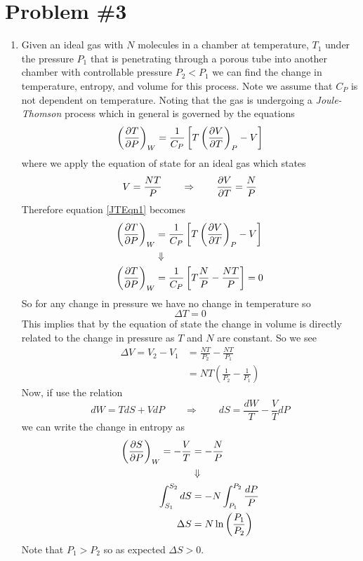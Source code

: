 \documentclass[11pt]{article}
\numberwithin{equation}{section}
\begin{document}
\section{Problem \#3}
\begin{enumerate}[(1)]
\item Given an ideal gas with $N$ molecules in a chamber at temperature, $T_1$ under the 
pressure $P_1$ that is penetrating through a porous tube into another chamber with 
controllable pressure $P_2<P_1$ we can find the change in temperature, entropy, and volume 
for this process. Note we assume that $C_P$ is not dependent on temperature. Noting that
the gas is undergoing a \emph{Joule-Thomson} process which in general is governed by the 
equations
\begin{equation}
\left(\frac{\partial{T}}{\partial{P}}\right)_{W} = \frac{1}{C_P}\left[T\left(\frac{\partial{V}}{\partial{T}}\right)_{P}-V\right]
\label{JTEqn1}
\end{equation}
where we apply the equation of state for an ideal gas which states
$$V = \frac{NT}{P}\qquad\Rightarrow\qquad \frac{\partial{V}}{\partial{T}} = \frac{N}{P}$$
Therefore equation \ref{JTEqn1} becomes
\begin{align*}
\left(\frac{\partial{T}}{\partial{P}}\right)_{W} &= \frac{1}{C_P}\left[T\left(\frac{\partial{V}}{\partial{T}}\right)_{P}-V\right]\\
&\Downarrow\\
\left(\frac{\partial{T}}{\partial{P}}\right)_{W} &= \frac{1}{C_P}\left[T\frac{N}{P}-\frac{NT}{P}\right] = 0
\end{align*}
So for any change in pressure we have no change in temperature so 
$$\Delta{T}=0$$
This implies that by the equation of state the change in volume is directly related to the 
change in pressure as $T$ and $N$ are constant. So we see
\begin{align*}
\Delta{V} = V_2-V_1 &= \frac{NT}{P_2} - \frac{NT}{P_1}\\
&= NT\left(\frac{1}{P_2} - \frac{1}{P_1}\right)
\end{align*}
Now, if use the relation
$$dW = TdS+VdP\qquad\Rightarrow\qquad dS = \frac{dW}{T} - \frac{V}{T}dP$$
we can write the change in entropy as
\begin{align*}
\left(\frac{\partial{S}}{\partial{P}}\right)_{W} = -\frac{V}{T} &= -\frac{N}{P}\\
&\Downarrow\\
\int_{S_1}^{S_2}dS &= -N\int_{P_1}^{P_2}\frac{dP}{P}\\
\Delta{S} &= N\ln\left(\frac{P_1}{P_2}\right)
\end{align*}
Note that $P_1>P_2$ so as expected $\Delta{S}>0$. 


\end{enumerate}
\end{document}

